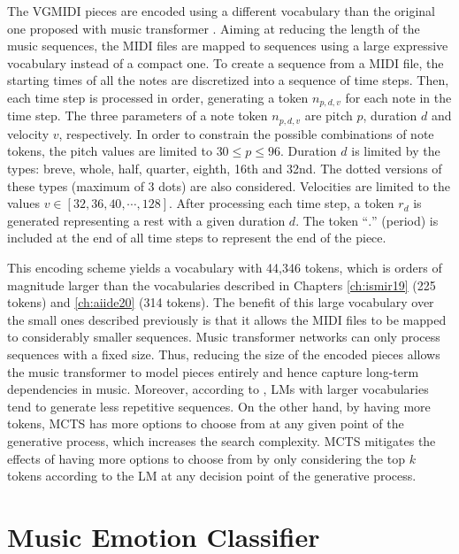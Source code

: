 The VGMIDI pieces are encoded using a different vocabulary than the original one proposed with music transformer \cite{huang2018music}. Aiming at reducing the length of the music sequences, the MIDI files are mapped to sequences using a large expressive vocabulary instead of a compact one. To create a sequence from a MIDI file, the starting times of all the notes are discretized into a sequence of time steps. Then, each time step is processed in order, generating a token $n_{p, d, v}$ for each note in the time step. The three parameters of a note token $n_{p, d, v}$ are pitch $p$, duration $d$ and velocity $v$, respectively. In order to constrain the possible combinations of note tokens, the pitch values are limited to $30 \leq p \leq 96$. Duration $d$ is limited by the types: breve, whole, half, quarter, eighth, 16th and 32nd. The dotted versions of these types (maximum of 3 dots) are also considered. Velocities are limited to the values $v \in [32, 36, 40, \cdots, 128]$. After processing each time step, a token $r_d$ is generated representing a rest with a given duration $d$. The token ``$.$'' (period) is included at the end of all time steps to represent the end of the piece.

This encoding scheme yields a vocabulary with 44,346 tokens, which is orders of magnitude larger than the vocabularies described in Chapters \ref{ch:ismir19} (225 tokens) and \ref{ch:aiide20} (314 tokens). The benefit of this large vocabulary over the small ones described previously is that it allows the MIDI files to be mapped to considerably smaller sequences. Music transformer networks can only process sequences with a fixed size. Thus, reducing the size of the encoded pieces allows the music transformer to model pieces entirely and hence capture long-term dependencies in music. Moreover, according to \citet{holtzman2018learning}, LMs with larger vocabularies tend to generate less repetitive sequences. On the other hand, by having more tokens, MCTS has more options to choose from at any given point of the generative process, which increases the search complexity. MCTS mitigates the effects of having more options to choose from by only considering the top $k$ tokens according to the LM at any decision point of the generative process.


\section{Music Emotion Classifier}
\label{sec:emotion_classifier}

